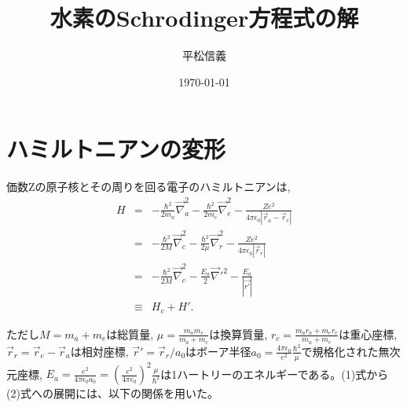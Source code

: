 \documentclass[11pt,a4paper]{jsarticle}
\title{水素のSchrodinger方程式の解}
\author{平松信義}
\date{\today}
\begin{document}
\maketitle

\section{ハミルトニアンの変形}
価数Zの原子核とその周りを回る電子のハミルトニアンは, 
\begin{eqnarray}
H &=& -\frac{\hbar^2}{2m_a} \vec{\nabla}_a^2 -\frac{\hbar^2}{2m_e} \vec{\nabla}_e^2 -\frac{Z e^2}{4\pi\epsilon_0|\vec{r}_a- \vec{r}_e |}\\
    &=& -\frac{\hbar^2}{2M} \vec{\nabla}_c^2 -\frac{\hbar^2}{2\mu} \vec{\nabla}_r^2 -\frac{Z e^2}{4\pi\epsilon_0|\vec{r}_r|}\\
    &=& -\frac{\hbar^2}{2M} \vec{\nabla}_c^2 -\frac{E_a}{2}\vec{\nabla}'^2 -\frac{E_a}{|\vec{r'}|}\\
    &\equiv& H_c + H'. 
\end{eqnarray}

ただし$M=m_a+m_e$は総質量, $\mu=\frac{m_a m_e}{m_a + m_e}$は換算質量, $r_c=\frac{m_a r_a+ m_e r_e}{m_a + m_e}$は重心座標, $\vec{r}_r= \vec{r}_e - \vec{r}_a$は相対座標, $\vec{r}'= \vec{r}_r/a_0$はボーア半径$a_0=\frac{4\pi\epsilon_0}{e^2} \frac{\hbar^2}{\mu}$で規格化された無次元座標, $E_a=\frac{ e^2}{4\pi\epsilon_0a_0}=(\frac{ e^2}{4\pi\epsilon_0})^2 \frac{\mu}{\hbar^2}$は1ハートリーのエネルギーである。(1)式から(2)式への展開には、以下の関係を用いた。
\end{document}
